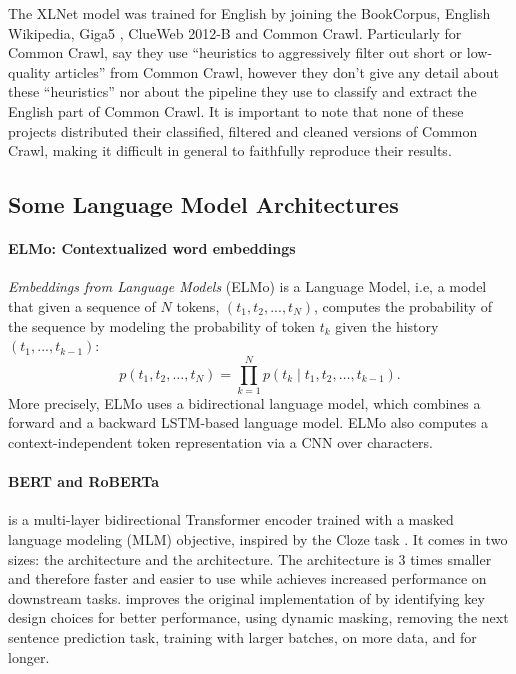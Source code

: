 The XLNet model was trained for English by joining the BookCorpus, English Wikipedia, Giga5 \citep{parker-etal-2011-english}, ClueWeb 2012-B \citep{callan-etal-2009-clueweb09} and Common Crawl. Particularly for Common Crawl, \citet{yang-etal-2019-xlnet} say they use ``heuristics to aggressively filter out short or low-quality articles'' from Common Crawl, however they don't give any detail about these ``heuristics'' nor about the pipeline they use to classify and extract the English part of Common Crawl. It is important to note that none of these projects distributed their classified, filtered and cleaned versions of Common Crawl, making it difficult in general to faithfully reproduce their results.

\subsection{Some Language Model Architectures}

\paragraph{ELMo: Contextualized word embeddings}
\emph{Embeddings from Language Models} (ELMo) \citep{peters-etal-2018-deep} is a Language Model, i.e, a model that given a sequence of $N$ tokens, $(t_1, t_2, ..., t_N)$, computes the probability of the sequence by modeling the probability of token $t_k$ given the history $(t_1, ..., t_{k-1})$:
\[
    p(t_1, t_2, \ldots, t_N) = \prod_{k=1}^N p({t_k} \mid t_1, t_2, \ldots, t_{k-1}).
\]
More precisely, ELMo uses a bidirectional language model, which combines a forward and a backward LSTM-based language model. ELMo also computes a context-independent token representation via a CNN over characters.

\paragraph{BERT and RoBERTa} \bert \citep{devlin-etal-2019-bert} is a multi-layer bidirectional Transformer encoder trained with a masked language modeling (MLM) objective, inspired by the Cloze task \citep{taylor-1953-cloze}. It comes in two sizes: the \bertbase architecture and the \bertlarge architecture. The \bertbase architecture is 3 times smaller and therefore faster and easier to use while \bertlarge achieves increased performance on downstream tasks. \roberta \citep{liu-etal-2019-roberta} improves the original implementation of \bert by identifying key design choices for better performance, using dynamic masking, removing the next sentence prediction task, training with larger batches, on more data, and for longer.

